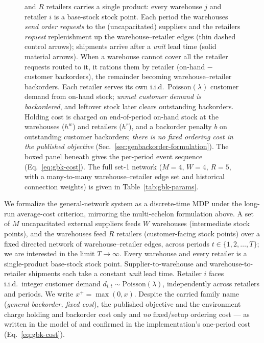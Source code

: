\begin{figure}[t]
{  and $R$ retailers carries a single product: every warehouse $j$ and retailer $i$ is a base-stock
  stock point. Each period the warehouses \emph{send order requests} to the (uncapacitated) suppliers
  and the retailers \emph{request} replenishment up the warehouse--retailer edges (thin dashed control
  arrows); shipments arrive after a \emph{unit} lead time (solid material arrows). When a warehouse
  cannot cover all the retailer requests routed to it, it rations them by retailer
  (on-hand $-$ customer backorders), the remainder becoming warehouse--retailer backorders. Each
  retailer serves its own i.i.d.\ $\mathrm{Poisson}(\lambda)$ customer demand from on-hand stock;
  \emph{unmet customer demand is backordered}, and leftover stock later clears outstanding backorders.
  Holding cost is charged on end-of-period on-hand stock at the warehouses ($h^w$) and retailers
  ($h^r$), and a backorder penalty $b$ on outstanding customer backorders; \emph{there is no fixed
  ordering cost in the published objective} (Sec.~\ref{sec:genbackorder-formulation}). The boxed panel
  beneath gives the per-period event sequence (Eq.~\eqref{eq:gbk-cost}). The full set-1 network
  ($M{=}4$, $W{=}4$, $R{=}5$, with a many-to-many warehouse--retailer edge set and historical
  connection weights) is given in Table~\ref{tab:gbk-params}.}
  \label{fig:env-genbackorder}
\end{figure}

We formalize the general-network system as a discrete-time MDP under the long-run average-cost
criterion, mirroring the multi-echelon formulation above. A set of $M$ uncapacitated external
suppliers feeds $W$ warehouses (intermediate stock points), and the warehouses feed $R$ retailers
(customer-facing stock points) over a fixed directed network of warehouse--retailer edges, across
periods $t\in\{1,2,\dots,T\}$; we are interested in the limit $T\to\infty$. Every warehouse and every
retailer is a single-product base-stock stock point. Supplier-to-warehouse and warehouse-to-retailer
shipments each take a constant \emph{unit} lead time. Retailer $i$ faces i.i.d.\ integer customer
demand $d_{i,t}\sim\mathrm{Poisson}(\lambda)$, independently across retailers and periods. We write
$x^+=\max(0,x)$. Despite the carried family name (\emph{general backorder, fixed cost}), the published
objective and the environment charge holding and backorder cost only and \emph{no} fixed/setup
ordering cost --- as written in the model of \citet{geevers2024cardboard} and confirmed in the
implementation's one-period cost (Eq.~\eqref{eq:gbk-cost}).

